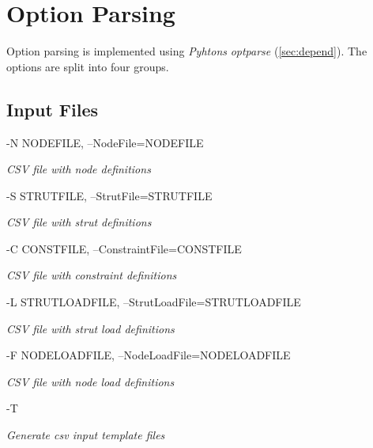 \section{Option Parsing}
\label{sec:optparse}

Option parsing is implemented using \textit{Pyhtons} \textit{optparse} (\cref{sec:depend}). The options are split into four groups.


\subsection{Input Files}
\label{subsec:inputFiles}

-N NODEFILE, --NodeFile=NODEFILE

\textit{CSV file with node definitions}

-S STRUTFILE, --StrutFile=STRUTFILE

\textit{CSV file with strut definitions}

-C CONSTFILE, --ConstraintFile=CONSTFILE

\textit{CSV file with constraint definitions}

-L STRUTLOADFILE, --StrutLoadFile=STRUTLOADFILE

\textit{CSV file with strut load definitions}

-F NODELOADFILE, --NodeLoadFile=NODELOADFILE

\textit{CSV file with node load definitions}

-T 

\textit{Generate csv input template files}


